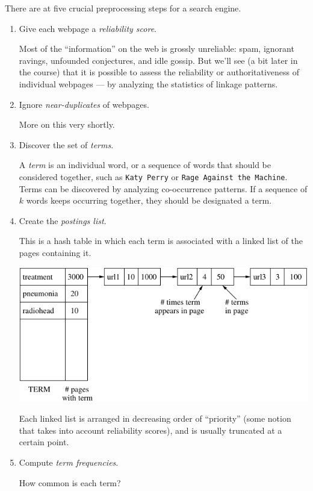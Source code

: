 There are at five crucial preprocessing steps for a search engine.
\begin{enumerate}
\item Give each webpage a {\it reliability score}.

Most of the ``information'' on the web is grossly unreliable: spam, ignorant ravings, unfounded conjectures, and idle gossip. But we'll see (a bit later in the course) that it is possible to assess the reliability or authoritativeness of individual webpages --- by analyzing the statistics of linkage patterns.

\item Ignore {\it near-duplicates} of webpages.

More on this very shortly.

\item Discover the set of {\it terms}.

A {\it term} is an individual word, or a sequence of words that should be considered together, such as {\tt Katy Perry} or {\tt Rage Against the Machine}. Terms can be discovered by analyzing co-occurrence patterns. If a sequence of $k$ words keeps occurring together, they should be designated a term.

\item Create the {\it postings list}.

This is a hash table in which each term is associated with a linked list of the pages containing it.

\begin{center}
\includegraphics[width=5in]{figs/postings.pdf}
\end{center}

Each linked list is arranged in decreasing order of ``priority'' (some notion that takes into account reliability scores), and is usually truncated at a certain point.

\item Compute {\it term frequencies}.

How common is each term?

\end{enumerate}


